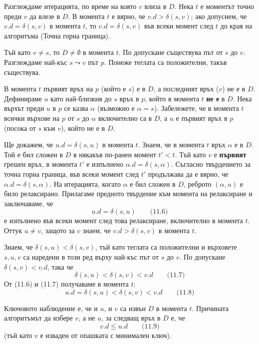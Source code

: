 \documentclass{article}
\renewcommand{\\}{\newline}
\begin{document}
    Разглеждаме итерацията, по време на която \(v\) влиза в \(D\). Нека \(t\) е моментът точно преди \(v\) да влезе в \(D\). В момента \(t\) е вярно, че \(v.d > \delta(s, v)\); ако допуснем, че \(v.d = \delta(s, v)\) в момента \(t\), то \(v.d = \delta(s, v)\) във всеки момент след \(t\) до края на алгоритъма (Точна горна граница).

    Тъй като \(v \neq s\), то \(D \neq \emptyset\) в момента \(t\). По допускане съществува път от \(s\) до \(v\). Разглеждаме най-къс \(s \leadsto v\) път \(p\). Понеже теглата са положителни, такъв съществува.

    В момента \(t\) първият връх на \(p\) (който е \(s\)) е в \(D\), а последният връх (\(v\)) не е в \(D\). Дефинираме \(u\) като най-близкия до \(s\) връх в \(p\), който в момента \(t\) \textbf{не е} в \(D\). Нека върхът преди \(u\) в \(p\) се казва \(\alpha\) (възможно е \(\alpha = s\)). Забележете, че в момента \(t\) всички върхове на \(p\) от \(s\) до \(\alpha\) включително са в \(D\), а \(u\) е първият връх в \(p\) (посока от \(s\) към \(v\)), който не е в \(D\).

    Ще докажем, че \(u.d = \delta(s, u)\) в момента \(t\). Знаем, че в момента \(t\) връх \(\alpha\) е в \(D\). Той е бил сложен в \(D\) в някакъв по-ранен момент \(t' < t\). Тъй като \(v\) е \textbf{първият} грешен връх, в момента \(t'\) е изпълнено \(\alpha.d = \delta(s, \alpha)\). Съгласно твърдението за точна горна граница, във всеки момент след \(t'\) продължава да е вярно, че \(\alpha.d = \delta(s, \alpha)\). На итерацията, когато \(\alpha\) е бил сложен в \(D\), реброто \((\alpha, u)\) е било релаксирано. Прилагаме предното твърдение към момента на релаксиране и заключаваме, че
    \[
    u.d = \delta(s, u) \qquad \text{(11.6)}
    \]
    е изпълнено във всеки момент след това релаксиране, включително в момента \(t\). Оттук \(u \neq v\), защото за \(v\) знаем, че \(v.d > \delta(s, v)\) в момента \(t\).

    Знаем, че \(\delta(s, u) < \delta(s, v)\), тъй като теглата са положителни и върховете \(s, u, v\) са наредени в този ред върху най-къс път от \(s\) до \(v\). По допускане \(\delta(s, v) < v.d\), така че
    \[
    \delta(s, u) < \delta(s, v) < v.d \qquad \text{(11.7)}
    \]
    От (11.6) и (11.7) получаваме в момента \(t\):
    \[
    u.d = \delta(s, u) < \delta(s, v) < v.d \qquad \text{(11.8)}
    \]

    Ключовото наблюдение е, че и \(u\), и \(v\) са извън \(D\) в момента \(t\). Причината алгоритъмът да избере \(v\), а не \(u\), за следващ връх в \(D\) е, че
    \[
    v.d \le u.d \qquad \text{(11.9)}
    \]
    (тъй като \(v\) е изваден от опашката с минимален ключ).
\end{document}
